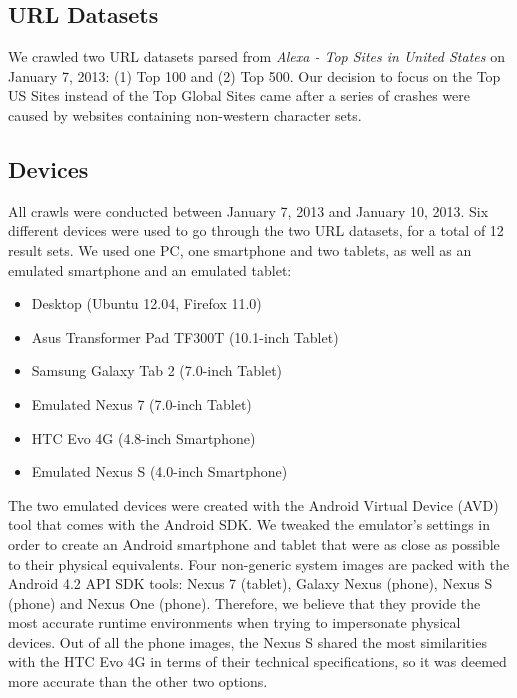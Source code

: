 \documentclass{acm_proc_article-sp}
\begin{document}
\subsection{URL Datasets}

We crawled two URL datasets parsed from \emph{Alexa - Top Sites in United States} on January 7, 2013: (1) Top 100 and (2) Top 500. Our decision to focus on the Top US Sites instead of the Top Global Sites came after a series of crashes were caused by websites containing non-western character sets.

\subsection{Devices}

All crawls were conducted between January 7, 2013 and January 10, 2013. Six different devices were used to go through the two URL datasets, for a total of 12 result sets. We used one PC, one smartphone and two tablets, as well as an emulated smartphone and an emulated tablet:

\begin{itemize}\itemsep0em 
\item Desktop (Ubuntu 12.04, Firefox 11.0)

\item Asus Transformer Pad TF300T (10.1-inch Tablet)

\item Samsung Galaxy Tab 2 (7.0-inch Tablet)

\item Emulated Nexus 7 (7.0-inch Tablet)

\item HTC Evo 4G (4.8-inch Smartphone)

\item Emulated Nexus S (4.0-inch Smartphone)
\end{itemize}

The two emulated devices were created with the Android Virtual Device (AVD) tool that comes with the Android SDK. We tweaked the emulator's settings in order to create an Android smartphone and tablet that were as close as possible to their physical equivalents. Four non-generic system images are packed with the Android 4.2 API SDK tools: Nexus 7 (tablet), Galaxy Nexus (phone), Nexus S (phone) and Nexus One (phone).  Therefore, we believe that they provide the most accurate runtime environments when trying to impersonate physical devices. Out of all the phone images, the Nexus S shared the most similarities with the HTC Evo 4G in terms of their technical specifications, so it was deemed more accurate than the other two options.
\end{document}
